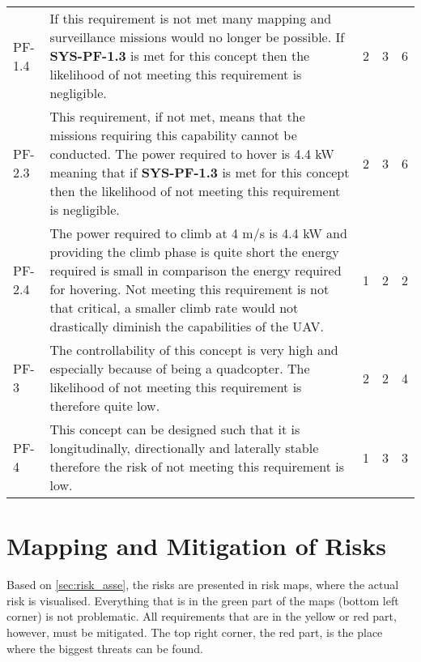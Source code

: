 \begin{table}[]
\begin{tabularx}{\textwidth}{l L l l l}
        PF-1.4          & If this requirement is not met many mapping and surveillance missions would no longer be possible. If \textbf{SYS-PF-1.3} is met for this concept then the likelihood of not meeting this requirement is negligible.                                               & 2 & 3 & 6
        \\ \hdashline
        PF-2.3          & This requirement, if not met, means that the missions requiring this capability cannot be conducted. The power required to hover is 4.4 kW meaning that if \textbf{SYS-PF-1.3} is met for this concept then the likelihood of not meeting this requirement is negligible.   & 2 & 3 & 6
        \\ \hdashline
        PF-2.4          & The power required to climb at 4 m/s is 4.4 kW and providing the climb phase is quite short the energy required is small in comparison the energy required for hovering. Not meeting this requirement is not that critical, a smaller climb rate would not drastically diminish the capabilities of the UAV.                                                                               & 1 & 2 & 2 
        \\ \hdashline
        PF-3            & The controllability of this concept is very high and especially because of being a quadcopter. The likelihood of not meeting this requirement is therefore quite low.    & 2 & 2 & 4
        \\ \hdashline        
        PF-4            & This concept can be designed such that it is longitudinally, directionally and laterally stable therefore the risk of not meeting this requirement is low.         & 1 & 3 & 3
        \\ \bottomrule  
    \end{tabularx}
\end{table}











\section{Mapping and Mitigation of Risks}
\label{sec:mapp_miti_risk}
Based on \autoref{sec:risk_asse}, the risks are presented in risk maps, where the actual risk is visualised. Everything that is in the green part of the maps (bottom left corner) is not problematic. All requirements that are in the yellow or red part, however, must be mitigated. The top right corner, the red part, is the place where the biggest threats can be found.






